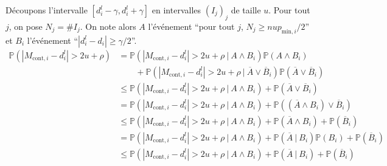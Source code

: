 Découpons l'intervalle \([d_i^l - \gamma, d_i^l + \gamma]\) en intervalles \((I_j)_j\) de taille \(u\). Pour tout \(j\), on pose \(N_j = \#I_j\). On note alors \(A\) l'événement ``pour tout \(j\), \(N_j \geq nup_{\text{min}, i}/2\)'' et \(B_i\) l'événement ``\(|d_i^l - d_i| \geq \gamma/2\)''.\\
\begin{align*}
    \mathbb P\left( |M_{\text{cont}, i} - d_i^l| > 2u + \rho \right) & = \mathbb P\left( |M_{\text{cont}, i} - d_i^l| > 2u + \rho \ | \ A \wedge B_i\right)\mathbb P\left( A \wedge B_i \right)\\
    & \quad \quad  + \mathbb P\left( |M_{\text{cont}, i} - d_i^l| > 2u + \rho \ | \ \overline A \vee \overline B_i\right) \mathbb P \left( \overline A \vee \overline B_i \right)\\
    & \leq \mathbb P\left( |M_{\text{cont}, i} - d_i^l| > 2u + \rho \ | \ A \wedge B_i\right) +   \mathbb P \left( \overline A \vee \overline B_i \right)\\
    & = \mathbb P\left( |M_{\text{cont}, i} - d_i^l| > 2u + \rho \ | \ A \wedge B_i\right) +   \mathbb P \left( (\overline A \wedge B_i) \vee \overline B_i \right)\\
    & \leq \mathbb P\left( |M_{\text{cont}, i} - d_i^l| > 2u + \rho \ | \ A \wedge B_i\right) +   \mathbb P \left( \overline A \wedge B_i\right) + \mathbb P \left( \overline B_i \right)\\
    & = \mathbb P\left( |M_{\text{cont}, i} - d_i^l| > 2u + \rho \ | \ A \wedge B_i\right) +   \mathbb P \left( \overline A \ |\ B_i\right)\mathbb P (B_i) + \mathbb P \left( \overline B_i \right)\\
    & \leq \mathbb P\left( |M_{\text{cont}, i} - d_i^l| > 2u + \rho \ | \ A \wedge B_i\right) +   \mathbb P \left( \overline A \ |\ B_i\right) + \mathbb P \left( \overline B_i \right)\\
\end{align*}


